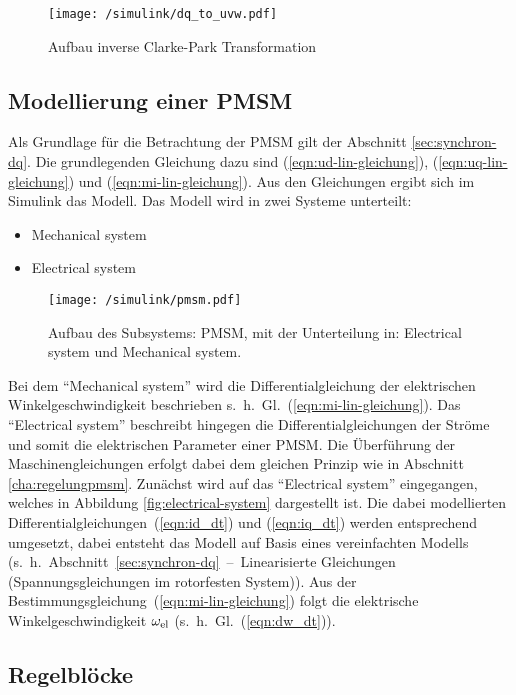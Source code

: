\begin{figure}[h]
	\centering
	\texttt{[image: /simulink/dq\_to\_uvw.pdf]}
	\label{fig:dq_to_uvw}
	\caption{Aufbau inverse Clarke-Park Transformation}
\end{figure}
\newpage

\subsection{Modellierung einer PMSM}

Als Grundlage für die Betrachtung der PMSM gilt der Abschnitt \ref{sec:synchron-dq}.
Die grundlegenden Gleichung dazu sind (\ref{eqn:ud-lin-gleichung}), (\ref{eqn:uq-lin-gleichung}) und (\ref{eqn:mi-lin-gleichung}).
Aus den Gleichungen ergibt sich im Simulink das Modell.
Das Modell wird in zwei Systeme unterteilt:

\begin{itemize}
	\item Mechanical system
	\item Electrical system
\end{itemize}

\begin{figure}[h!]
	\centering
	\texttt{[image: /simulink/pmsm.pdf]}
	\label{fig:pmsm}
	\caption{Aufbau des Subsystems: PMSM, mit der Unterteilung in: Electrical system und Mechanical system.}
\end{figure}

Bei dem \enquote{Mechanical system} wird die Differentialgleichung der elektrischen Winkelgeschwindigkeit beschrieben s.~h.~Gl.~(\ref{eqn:mi-lin-gleichung}).
Das \enquote{Electrical system} beschreibt hingegen die Differentialgleichungen der Ströme und somit die elektrischen Parameter einer PMSM.
Die Überführung der Maschinengleichungen erfolgt dabei dem gleichen Prinzip wie in Abschnitt \ref{cha:regelungpmsm}.
Zunächst wird auf das \enquote{Electrical system} eingegangen, welches in Abbildung \ref{fig:electrical-system} dargestellt ist.
Die dabei modellierten Differentialgleichungen~(\ref{eqn:id_dt}) und (\ref{eqn:iq_dt}) werden entsprechend umgesetzt, dabei entsteht das Modell auf Basis eines vereinfachten Modells (s.~h.~Abschnitt~\ref{sec:synchron-dq}~--~Linearisierte Gleichungen (Spannungsgleichungen im rotorfesten System)).
Aus der Bestimmungsgleichung~(\ref{eqn:mi-lin-gleichung}) folgt die elektrische Winkelgeschwindigkeit $\omega_{\mathrm{el}}$ (s.~h.~Gl.~(\ref{eqn:dw_dt})).

\subsection{Regelblöcke}

